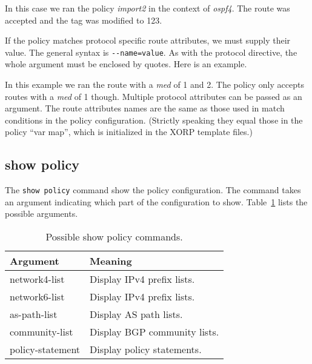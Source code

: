 In this case we ran the policy {\em import2} in the context of {\em ospf4}.  The
route was accepted and the tag was modified to 123.

If the policy matches protocol specific route attributes, we must supply their
value.  The general syntax is \verb|--name=value|.  As with the protocol
directive, the whole argument must be enclosed by quotes.  Here is an example.

\noindent{}

In this example we ran the route with a {\em med} of 1 and 2.  The policy only
accepts routes with a {\em med} of 1 though.  Multiple protocol attributes can
be passed as an argument.  The route attributes names are the same as those used
in match conditions in the policy configuration.  (Strictly speaking they equal
those in the policy ``var map'', which is initialized in the XORP template
files.)

\subsection{show policy}
The {\tt show policy} command show the policy configuration.  The command takes
an argument indicating which part of the configuration to show.
Table~\ref{tab:policy:show} lists the possible arguments.
\begin{table}
\begin{center}
\begin{tabular}{|l|l|}
\hline
Argument	& Meaning \\
\hline\hline
network4-list	 & Display IPv4 prefix lists. \\
network6-list	 & Display IPv4 prefix lists. \\
as-path-list	 & Display AS path lists. \\
community-list   & Display BGP community lists. \\
policy-statement & Display policy statements. \\
\hline
\end{tabular}
\end{center}
\caption{\label{tab:policy:show}Possible show policy commands.}
\end{table}

